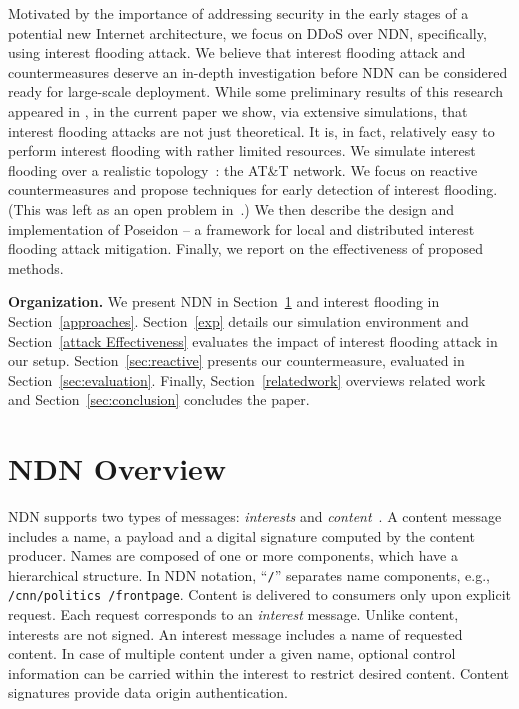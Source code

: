 \documentclass[10pt,conference,letterpaper]{IEEEtran}
\newcommand{\ndnname}[1]{{\small \tt #1}}
\newcommand{\descr}[1]{\medskip\noindent\textbf{#1}}
\renewcommand{\paragraph}{\descr}
\begin{document}
Motivated by the importance of addressing security in the early stages of a potential
new Internet architecture, we focus on DDoS over NDN, specifically, using interest flooding attack. 
We believe that interest flooding attack and countermeasures deserve an in-depth investigation before 
NDN can be considered ready for large-scale deployment.
While some preliminary results of this research appeared in \cite{NDN-ACSAC}, in the current paper  
we show, via extensive simulations,  that interest flooding attacks
are not just theoretical.  It is, in fact, relatively easy to perform interest flooding with 
rather limited resources. We simulate interest flooding over 
a realistic topology~\cite{Heckmann03onrealistic}: the AT\&T network. 
We focus on reactive countermeasures and propose techniques for early detection
of interest flooding. (This was left as an open problem in~\cite{ndn-dos}.) We then describe the 
design and implementation of Poseidon -- a framework for local and distributed interest flooding attack 
mitigation. Finally, we report on the effectiveness of proposed methods.




\paragraph{Organization.}
We present NDN in Section~\ref{sec:overview} and interest flooding in Section~\ref{approaches}.
Section~\ref{exp} details our simulation environment and Section~\ref{attack 
Effectiveness} evaluates the impact of interest flooding attack in our setup. Section~\ref{sec:reactive} 
presents our countermeasure, evaluated in Section~\ref{sec:evaluation}. 
Finally, Section~\ref{relatedwork} overviews related work and Section~\ref{sec:conclusion}
concludes the paper.


\section{NDN Overview}
\label{sec:overview}

NDN supports two types of messages: {\em interests} and 
{\em content}~\cite{ccnx-protocol}. 
A content message includes a name, a payload and a digital signature 
computed by the content producer.
Names are composed of one or 
more components, which have a hierarchical structure. In NDN notation, ``\ndnname{/}'' 
separates name components, e.g., \ndnname{/cnn/politics /frontpage}.
Content is delivered to consumers only upon explicit request. Each request corresponds to 
an {\em interest} message. Unlike content, interests are not signed. An interest message 
includes a name of requested content.
In case of multiple content under a given name, optional 
control information can be carried within the interest to restrict desired content. 
Content signatures provide data origin authentication. 
\end{document}
